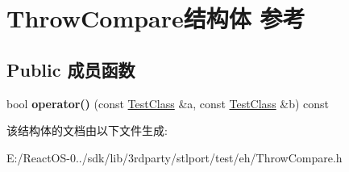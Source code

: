 \hypertarget{struct_throw_compare}{}\section{Throw\+Compare结构体 参考}
\label{struct_throw_compare}
\subsection*{Public 成员函数}
\begin{DoxyCompactItemize}
\item 
\mbox{\label{struct_throw_compare_add808b4acae37b8235fbf102c88ae7fb}} 
bool {\bfseries operator()} (const \hyperlink{class_test_class}{Test\+Class} \&a, const \hyperlink{class_test_class}{Test\+Class} \&b) const
\end{DoxyCompactItemize}


该结构体的文档由以下文件生成\+:\begin{DoxyCompactItemize}
\item 
E\+:/\+React\+O\+S-\/0../sdk/lib/3rdparty/stlport/test/eh/Throw\+Compare.\+h\end{DoxyCompactItemize}
